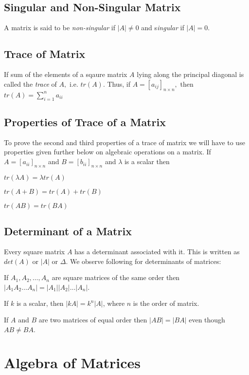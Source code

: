 \subsection{Singular and Non-Singular Matrix}
A matrix is said to be {\it non-singular} if $|A|\neq 0$ and s{\it ingular} if $|A| = 0$.

\subsection{Trace of Matrix}
If sum of the elements of a sqaure matrix $A$ lying along the principal diagonal is called the {\it trace} of $A,$
i.e. $tr(A)$. Thus, if $A = [a_{ij}]_{n\times n},$ then $tr(A) = \sum_{i = 1}^n a_{ii}$

\subsection{Properties of Trace of a Matrix}
To prove the second and third properties of a trace of matrix we will have to use properties given further below on algebraic
operations on a matrix. If $A = [a_{ii}]_{n\times n}$ and $B = [b_{ii}]_{n\times n}$ and $\lambda$ is a scalar then

\startitemize[n]
\item $tr(\lambda A) = \lambda tr(A)$
\item $tr(A + B) = tr(A) + tr(B)$
\item $tr(AB) = tr(BA)$
\stopitemize

\subsection{Determinant of a Matrix}
Every square matrix $A$ has a determinant associated with it. This is written as $det(A)$ or $|A|$ or $\Delta$. We observe
following for determinants of matrices:

\startitemize[n]
\item  If $A_1, A_2, \ldots, A_n$ are square matrices of the same order then $|A_1A_2\ldots A_n| = |A_1||A_2|\ldots|A_n|$.
\item If $k$ is a scalar, then $|kA| = k^n|A|$, where $n$ is the   order of matrix.
\item If $A$ and $B$ are two matrices of equal order then $|AB| = |BA|$ even though $AB\neq BA$.
\stopitemize

\section{Algebra of Matrices}

